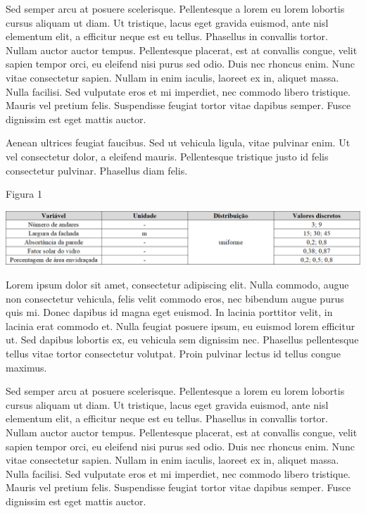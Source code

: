\documentclass[brazil,hardcopy,openany,a5paper]{ufscthesis}
\begin{document}
	Sed semper arcu at posuere scelerisque. Pellentesque a lorem eu lorem lobortis cursus aliquam ut diam. Ut tristique, lacus eget gravida euismod, ante nisl elementum elit, a efficitur neque est eu tellus. Phasellus in convallis tortor. Nullam auctor auctor tempus. Pellentesque placerat, est at convallis congue, velit sapien tempor orci, eu eleifend nisi purus sed odio. Duis nec rhoncus enim. Nunc vitae consectetur sapien. Nullam in enim iaculis, laoreet ex in, aliquet massa. Nulla facilisi. Sed vulputate eros et mi imperdiet, nec commodo libero tristique. Mauris vel pretium felis. Suspendisse feugiat tortor vitae dapibus semper. Fusce dignissim est eget mattis auctor.

	Aenean ultrices feugiat faucibus. Sed ut vehicula ligula, vitae pulvinar enim. Ut vel consectetur dolor, a eleifend mauris. Pellentesque tristique justo id felis consectetur pulvinar. Phasellus diam felis.

\begin{table}[!h]
	\centering
	\caption{Figura 1}
	\includegraphics[width=1\linewidth]{img/tabelaedificacao.png}
	\label{table:tabelaedificacao}
\end{table}

	Lorem ipsum dolor sit amet, consectetur adipiscing elit. Nulla commodo, augue non consectetur vehicula, felis velit commodo eros, nec bibendum augue purus quis mi. Donec dapibus id magna eget euismod. In lacinia porttitor velit, in lacinia erat commodo et. Nulla feugiat posuere ipsum, eu euismod lorem efficitur ut. Sed dapibus lobortis ex, eu vehicula sem dignissim nec. Phasellus pellentesque tellus vitae tortor consectetur volutpat. Proin pulvinar lectus id tellus congue maximus.

Sed semper arcu at posuere scelerisque. Pellentesque a lorem eu lorem lobortis cursus aliquam ut diam. Ut tristique, lacus eget gravida euismod, ante nisl elementum elit, a efficitur neque est eu tellus. Phasellus in convallis tortor. Nullam auctor auctor tempus. Pellentesque placerat, est at convallis congue, velit sapien tempor orci, eu eleifend nisi purus sed odio. Duis nec rhoncus enim. Nunc vitae consectetur sapien. Nullam in enim iaculis, laoreet ex in, aliquet massa. Nulla facilisi. Sed vulputate eros et mi imperdiet, nec commodo libero tristique. Mauris vel pretium felis. Suspendisse feugiat tortor vitae dapibus semper. Fusce dignissim est eget mattis auctor.
\end{document}
